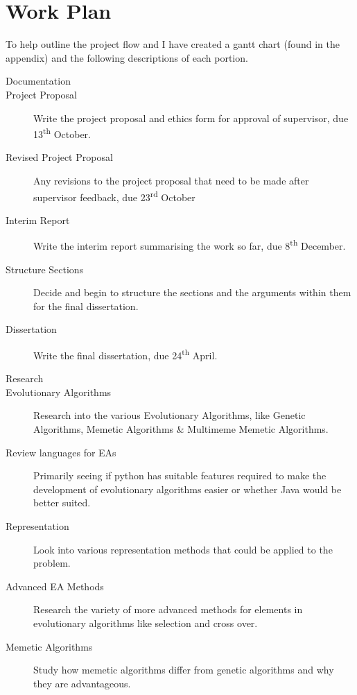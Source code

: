 \documentclass[a4paper]{article}
\begin{document}
\section{Work Plan}
To help outline the project flow and I have created a gantt chart (found in the appendix) and the following descriptions of each portion.

\begin{description}
\item [\large{Documentation}]
\item [Project Proposal] Write the project proposal and ethics form for approval of supervisor, due 13\textsuperscript{th} October.
\item [Revised Project Proposal] Any revisions to the project proposal that need to be made after supervisor feedback, due 23\textsuperscript{rd} October
\item [Interim Report] Write the interim report summarising the work so far, due 8\textsuperscript{th} December.
\item [Structure Sections] Decide and begin to structure the sections and the arguments within them for the final dissertation.
\item [Dissertation] Write the final dissertation, due 24\textsuperscript{th} April.

\item [\large{Research}]
\item [Evolutionary Algorithms] Research into the various Evolutionary Algorithms, like Genetic Algorithms, Memetic Algorithms \& Multimeme Memetic Algorithms.
\item [Review languages for EAs] Primarily seeing if python has suitable features required to make the development of evolutionary algorithms easier or whether Java would be better suited.
\item [Representation] Look into various representation methods that could be applied to the problem.
\item [Advanced EA Methods] Research the variety of more advanced methods for elements in evolutionary algorithms like selection and cross over.
\item [Memetic Algorithms] Study how memetic algorithms differ from genetic algorithms and why they are advantageous.


\end{description}
\end{document}
